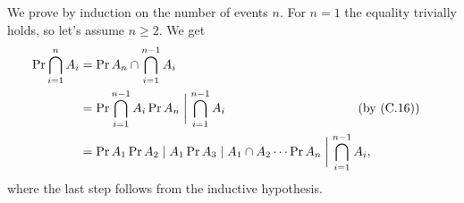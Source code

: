 We prove by induction on the number of events $n$.
For $n=1$ the equality trivially holds, so let's assume $n\ge2$.
We get
\begin{align*}
    \Pr{\bigcap_{i=1}^nA_i} &= \Pr{A_n\cap\bigcap_{i=1}^{n-1}A_i} \\
    &= \Pr{\bigcap_{i=1}^{n-1}A_i}\Pr{A_n\biggm|\bigcap_{i=1}^{n-1}A_i} && \hspace{-2em}\text{(by (C.16))} \\
    &= \Pr{A_1}\Pr{A_2\mid A_1}\Pr{A_3\mid A_1\cap A_2}\cdots\Pr{A_n\biggm|\bigcap_{i=1}^{n-1}A_i},
\end{align*}
where the last step follows from the inductive hypothesis.
